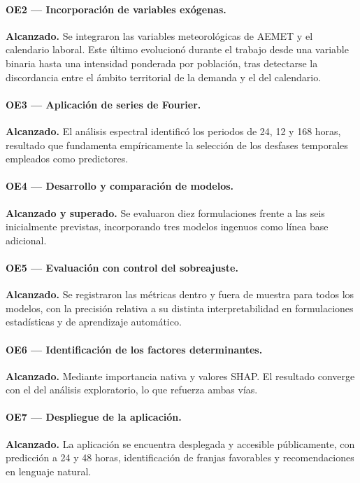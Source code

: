 \paragraph{OE2 — Incorporación de variables exógenas.}
\textbf{Alcanzado.} Se integraron las variables meteorológicas de AEMET y el
calendario laboral. Este último evolucionó durante el trabajo desde una variable
binaria hasta una intensidad ponderada por población, tras detectarse la
discordancia entre el ámbito territorial de la demanda y el del calendario.

\paragraph{OE3 — Aplicación de series de Fourier.}
\textbf{Alcanzado.} El análisis espectral identificó los periodos de 24, 12 y 168
horas, resultado que fundamenta empíricamente la selección de los desfases
temporales empleados como predictores.

\paragraph{OE4 — Desarrollo y comparación de modelos.}
\textbf{Alcanzado y superado.} Se evaluaron diez formulaciones frente a las seis
inicialmente previstas, incorporando tres modelos ingenuos como línea base
adicional.

\paragraph{OE5 — Evaluación con control del sobreajuste.}
\textbf{Alcanzado.} Se registraron las métricas dentro y fuera de muestra para
todos los modelos, con la precisión relativa a su distinta interpretabilidad en
formulaciones estadísticas y de aprendizaje automático.

\paragraph{OE6 — Identificación de los factores determinantes.}
\textbf{Alcanzado.} Mediante importancia nativa y valores SHAP. El resultado
converge con el del análisis exploratorio, lo que refuerza ambas vías.

\paragraph{OE7 — Despliegue de la aplicación.}
\textbf{Alcanzado.} La aplicación se encuentra desplegada y accesible
públicamente, con predicción a 24 y 48 horas, identificación de franjas favorables
y recomendaciones en lenguaje natural.

